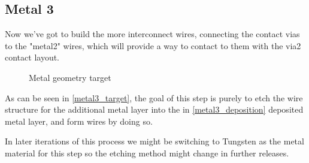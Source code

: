 \subsection{Metal 3}\label{chapter_metal3}
Now we've got to build the more interconnect wires, connecting the contact vias to the "metal2" wires, which will provide a way to contact to them with the via2 contact layout.

\begin{figure}[H]
	\centering
	\begin{tikzpicture}[node distance = 3cm, auto, thick,scale=\CrossAndTopSectionBig, every node/.style={transform shape}]
		
	\end{tikzpicture}
	\caption{Metal geometry target}
	\label{metal3_target}
\end{figure}

As can be seen in \autoref{metal3_target}, the goal of this step is purely to etch the wire structure for the additional metal layer into the in \autoref{metal3_deposition} deposited metal layer, and form wires by doing so.

In later iterations of this process we might be switching to Tungsten as the metal material for this step so the etching method might change in further releases.

